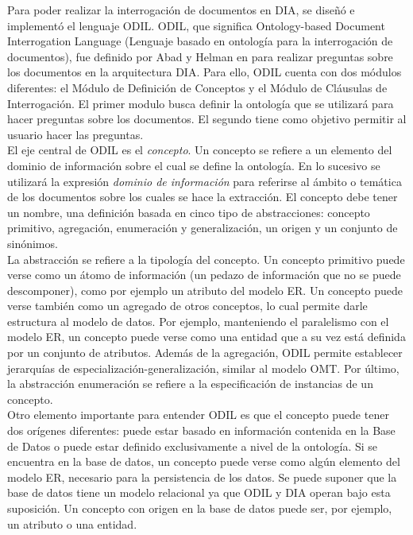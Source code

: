 Para poder realizar la interrogación de documentos en DIA, se diseñó e implementó el lenguaje ODIL. ODIL, que significa Ontology-based Document Interrogation Language (Lenguaje basado en ontología para la interrogación de documentos), fue definido por Abad y Helman en \cite{ODILdefinition}  para realizar preguntas sobre los documentos en la arquitectura DIA. Para ello, ODIL cuenta con dos módulos diferentes: el Módulo de Definición de Conceptos y el Módulo de Cláusulas de Interrogación. El primer modulo busca definir la ontología que se utilizará para hacer preguntas sobre los documentos. El segundo tiene como objetivo permitir al usuario hacer las preguntas.\\

El eje central de ODIL es el \emph{concepto}. Un concepto se refiere a un elemento del dominio de información sobre el cual se define la ontología. En lo sucesivo se utilizará  la expresión \emph{dominio de información} para referirse al ámbito o temática de los documentos sobre los cuales se hace la extracción. El concepto debe tener un nombre, una definición basada en cinco tipo de abstracciones: concepto primitivo, agregación, enumeración y generalización, un origen y un conjunto de sinónimos.\\

La abstracción se refiere a la tipología del concepto. Un concepto primitivo puede verse como un átomo de información (un pedazo de información que no se puede descomponer), como por ejemplo un atributo del modelo ER. Un concepto puede verse también como un agregado de otros conceptos, lo cual permite darle estructura al modelo de datos. Por ejemplo, manteniendo el paralelismo con el modelo ER, un concepto puede verse como una entidad que a su vez está definida por un conjunto de atributos. Además de la agregación, ODIL permite establecer jerarquías de especialización-generalización, similar al modelo OMT. Por último, la abstracción enumeración se refiere a la especificación de instancias de un concepto.\\

Otro elemento importante para entender ODIL es que el concepto puede tener dos orígenes diferentes: puede estar basado en información contenida en la Base de Datos o puede estar definido exclusivamente a nivel de la ontología. Si se encuentra en la base de datos, un concepto puede verse como algún elemento del modelo ER, necesario para la persistencia de los datos. Se puede suponer que la base de datos tiene un modelo relacional ya que ODIL y DIA operan bajo esta suposición. Un concepto con origen en la base de datos puede ser, por ejemplo, un atributo o una entidad. \\


